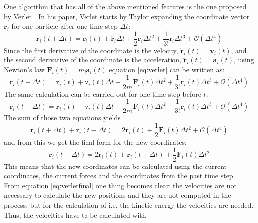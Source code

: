 \documentclass[12pt]{article}
\begin{document}
One algorithm that has all of the above mentioned features is the one proposed by Verlet \cite{Verlet1967}. In his paper, Verlet starts by Taylor
expanding the coordinate vector $\mathbf{r}_i$ for one particle after one time step $\Delta t$:
\begin{equation}
    \label{eq:verlet}
    \mathbf{r}_i(t+\Delta t) = \mathbf{r}_i(t) + \dot{\mathbf{r}}_i \Delta t + \frac12 \ddot{\mathbf{r}}_i \Delta t^2 + \frac1{3!} \dddot{\mathbf{r}}_i \Delta t^3 +
    \mathcal{O}(\Delta t^4)
\end{equation}
Since the first derivative of the coordinate is the velocity, $\dot{\mathbf{r}}_i(t) = \mathbf{v}_i(t)$, and the second derivative of the coordinate 
is the acceleration, $\ddot{\mathbf{r}}_i(t) = \mathbf{a}_i(t)$, using Newton's law $\mathbf{F}_i(t) = m_i \mathbf{a}_i(t)$ equation \eqref{eq:verlet} 
can be written as:
\begin{equation}
    \label{eq:verletnew}
    \mathbf{r}_i(t+\Delta t) = \mathbf{r}_i(t) + {\mathbf{v}}_i(t) \Delta t + \frac1{2m} {\mathbf{F}}_i(t) \Delta t^2 + \frac1{3!} \dddot{\mathbf{r}}_i(t)
    \Delta t^3+\mathcal{O}(\Delta t^4)
\end{equation}
The same calculation can be carried out for one time step before $t$:
\begin{equation}
    \label{eq:verletnewminus}
    \mathbf{r}_i(t-\Delta t) = \mathbf{r}_i(t) - {\mathbf{v}}_i(t) \Delta t + \frac1{2m} {\mathbf{F}}_i(t) \Delta t^2 - \frac1{3!} \dddot{\mathbf{r}}_i(t) \Delta t^3+
    \mathcal{O}(\Delta t^4)
\end{equation}
The sum of those two equations yields
\begin{equation}
    \mathbf{r}_i(t+\Delta t) + \mathbf{r}_i(t-\Delta t) = 2\mathbf{r}_i(t) + \frac1{2} {\mathbf{F}}_i(t) \Delta t^2 + \mathcal{O}(\Delta t^4)
\end{equation}
and from this we get the final form for the new coordinates:
\begin{equation}
    \label{eq:verletfinal}
    \mathbf{r}_i(t+\Delta t) = 2\mathbf{r}_i(t)+ \mathbf{r}_i(t-\Delta t)+ \frac1{2} {\mathbf{F}}_i(t) \Delta t^2
\end{equation}
This means that the new coordinates can be calculated using the current coordinates, the current forces and the coordinates from the past time step.\\
From equation \eqref{eq:verletfinal} one thing becomes clear: the velocities are not necessary to calculate the new positions and they are not
computed in the process, but for the calculation of i.e. the kinetic energy the velocities are needed. Thus, the velocities have to be calculated with
\end{document}
